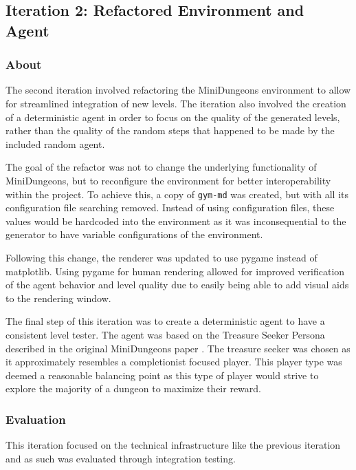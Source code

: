 \subsection{Iteration 2: Refactored Environment and Agent}
\subsubsection{About}
The second iteration involved refactoring the MiniDungeons environment to allow for streamlined integration of new levels. 
The iteration also involved the creation of a deterministic agent in order to focus on the quality of the generated levels, 
rather than the quality of the random steps that happened to be made by the included random agent.

The goal of the refactor was not to change the underlying functionality of MiniDungeons, but to reconfigure the environment for better
interoperability within the project. To achieve this, a copy of \texttt{gym-md} was created, but with all its configuration file searching removed.
Instead of using configuration files, these values would be hardcoded into the environment as it was inconsequential to the generator to have 
variable configurations of the environment.

Following this change, the renderer was updated to use pygame instead of matplotlib. Using pygame for human rendering allowed for 
improved verification of the agent behavior and level quality due to easily being able to add visual aids to the rendering window.

The final step of this iteration was to create a deterministic agent to have a consistent level tester. The agent was based on the Treasure Seeker Persona 
described in the original MiniDungeons paper \cite{holmgard2014evolvingpersonas}. The treasure seeker was chosen as it approximately resembles a completionist 
focused player. This player type was deemed a reasonable balancing point as this type of player would strive to explore the majority of a dungeon to maximize 
their reward.

\subsubsection{Evaluation}
This iteration focused on the technical infrastructure like the previous iteration and as such was evaluated through integration testing.

